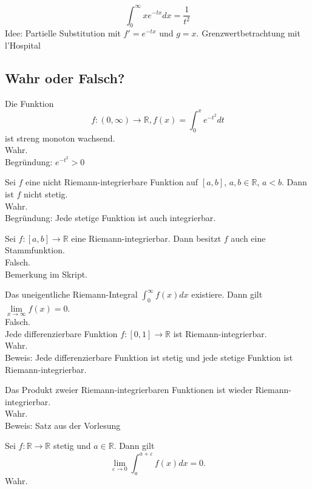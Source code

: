 \begin{displaymath}
  \int_{0}^{\infty} xe^{-tx} dx = \frac{1}{t^2}
\end{displaymath}
Idee: Partielle Substitution mit $f' = e^{-tx}$ und $g = x$. Grenzwertbetrachtung mit l'Hospital

\subsection{Wahr oder Falsch?}
Die Funktion
\begin{displaymath}
  f: (0,\infty) \to \mathbb{R}, f(x) = \int_{0}^{x} e^{-t^2}dt
\end{displaymath}
ist streng monoton wachsend.\\
Wahr.\\
Begründung: $e^{-t^2} > 0$

Sei $f$ eine nicht Riemann-integrierbare Funktion auf $[a,b]$, $a,b \in \mathbb{R}$, $a < b$.
Dann ist $f$ nicht stetig.\\
Wahr.\\
Begründung: Jede stetige Funktion ist auch integrierbar.

Sei $f:[a,b] \to \mathbb{R}$ eine Riemann-integrierbar.
Dann besitzt $f$ auch eine Stammfunktion.\\
Falsch.\\
Bemerkung im Skript.

Das uneigentliche Riemann-Integral $\int_{0}^{\infty} f(x)dx$ existiere.
Dann gilt $\lim\limits_{x \to \infty} f(x) = 0$.\\
Falsch.\\

Jede differenzierbare Funktion $f:[0,1] \to \mathbb{R}$ ist Riemann-integrierbar.\\
Wahr.\\
Beweis: Jede differenzierbare Funktion ist stetig und jede stetige Funktion ist Riemann-integrierbar.

Das Produkt zweier Riemann-integrierbaren Funktionen ist wieder Riemann-integrierbar.\\
Wahr.\\
Beweis: Satz aus der Vorlesung

Sei $f: \mathbb{R} \to \mathbb{R}$ stetig und $a \in \mathbb{R}$.
Dann gilt
\begin{displaymath}
  \lim_{\varepsilon \to 0} \int_{a}^{a + \varepsilon} f(x)dx = 0.
\end{displaymath}
Wahr.\\

